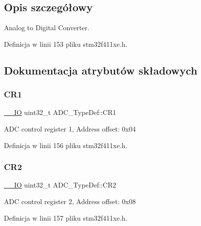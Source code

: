 \subsection{Opis szczegółowy}
Analog to Digital Converter. 

Definicja w linii 153 pliku stm32f411xe.\+h.



\subsection{Dokumentacja atrybutów składowych}
\mbox{\label{struct_a_d_c___type_def_a89b1ff4376683dd2896ea8b32ded05b2}} 
\subsubsection{\texorpdfstring{C\+R1}{CR1}}
{\footnotesize\ttfamily \hyperlink{core__sc300_8h_aec43007d9998a0a0e01faede4133d6be}{\+\_\+\+\_\+\+IO} uint32\+\_\+t A\+D\+C\+\_\+\+Type\+Def\+::\+C\+R1}

A\+DC control register 1, Address offset\+: 0x04 

Definicja w linii 156 pliku stm32f411xe.\+h.

\mbox{\label{struct_a_d_c___type_def_a1053a65a21af0d27afe1bf9cf7b7aca7}} 
\subsubsection{\texorpdfstring{C\+R2}{CR2}}
{\footnotesize\ttfamily \hyperlink{core__sc300_8h_aec43007d9998a0a0e01faede4133d6be}{\+\_\+\+\_\+\+IO} uint32\+\_\+t A\+D\+C\+\_\+\+Type\+Def\+::\+C\+R2}

A\+DC control register 2, Address offset\+: 0x08 

Definicja w linii 157 pliku stm32f411xe.\+h.

\mbox{\label{struct_a_d_c___type_def_a84114accead82bd11a0e12a429cdfed9}} 
